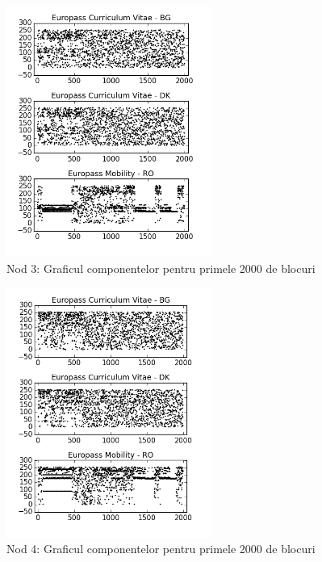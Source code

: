\documentclass{llncs}
\begin{document}
\begin{figure}
\begin{center}
\includegraphics[width=0.6\textwidth]{img/db3.png}    %
\caption{Nod 3: Graficul componentelor pentru primele 2000 de blocuri} 
\label{fig:db3}
\end{center}
\end{figure}

\begin{figure}
\begin{center}
\includegraphics[width=0.6\textwidth]{img/db4.png}    %
\caption{Nod 4: Graficul componentelor pentru primele 2000 de blocuri} 
\label{fig:db4}
\end{center}
\end{figure}
\end{document}

